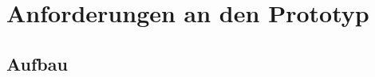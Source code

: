 \chapter{Anforderungen an den Prototyp}
\label{cha:Prototyp}

\section{Aufbau}
\label{sec:Prototyp_Aufbau}

